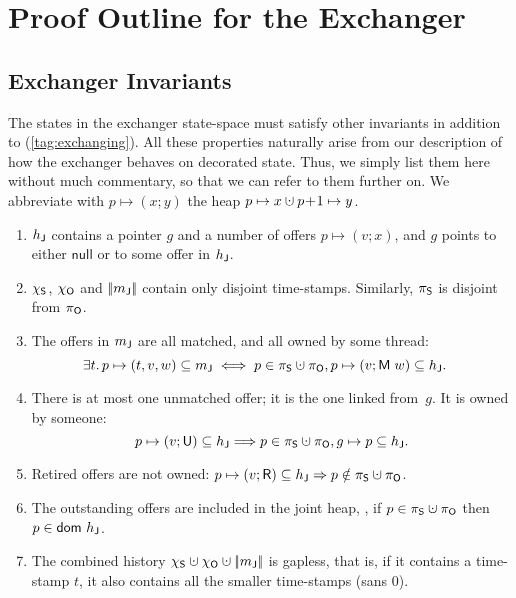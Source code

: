 \section{Proof Outline for the Exchanger}
\label{app:exch}

\subsection{Exchanger Invariants}
%

The states in the exchanger state-space must satisfy other invariants
in addition to (\ref{tag:exchanging}). All these properties naturally
arise from our description of how the exchanger behaves on decorated
state. Thus, we simply list them here without much commentary, so that
we can refer to them further on. We abbreviate with $p \mapsto (x; y)$
the heap $p \mapsto x \hunion p\!+\!1 \mapsto y$.

\begin{enumerate}[label=(\roman*)]
\item\label{exP} $h_{\mathsf{J}}$ contains a pointer $g$ and a number of
  offers $p \mapsto (v; x)$, and $g$ points to either $\mathsf{null}$
  or to some offer in $h_{\mathsf{J}}$.

\item $\chi_{\mathsf{S}}$, $\chi_{\mathsf{O}}$ and $|\!|{{m_{\mathsf{J}}}}|\!|$ contain only
  disjoint time-stamps. Similarly, $\pi_{\mathsf{S}}$ is disjoint from $\pi_{\mathsf{O}}$.

\item\label{matched} The offers in ${m_{\mathsf{J}}}$ are all matched, and all
  owned by some thread:
\[
\!\!\!\!\!\!
{\small{
\exists t\ldot p \mapsto (t, v, w) \subseteq \pending \iff p \in
\perms \hunion \permo, p \mapsto (v; \Matched w) \subseteq \heapj.
}}
\]
\item There is at most one unmatched offer; it is the one linked
  from~$g$. It is owned by someone:
\[
{\small{
p \mapsto (v; \Unmatched) \subseteq \heapj \Longrightarrow p \in \perms \hunion
\permo, g \mapsto p \subseteq \heapj.
}}
\]
\item Retired offers are not owned: $p \mapsto (v; \Retired)
  \subseteq \heapj \Rightarrow p \notin \perms \hunion \permo$.

\item The outstanding offers are included in the joint heap, \ie, if
  $p \in \perms \hunion \permo$ then $p \in \mathsf{dom}\ h_{\mathsf{J}}$.

\item\label{ex:gapless} The combined history $\hists \hunion \histo \hunion
  \mygather{\pending}$ is gapless, that is, if it contains a
  time-stamp $t$, it also contains all the smaller time-stamps (sans
  0).

\end{enumerate}

